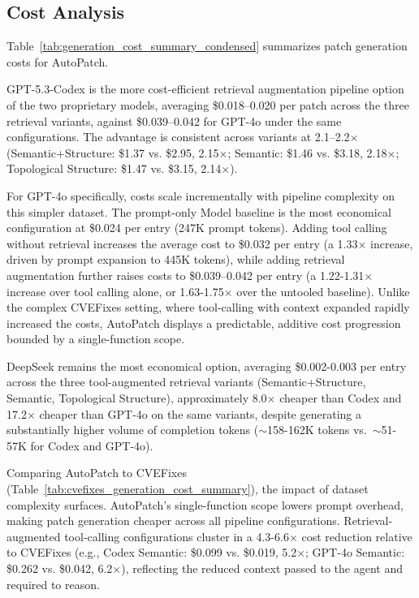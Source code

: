 \subsection{Cost Analysis}\label{sec:autopatch_cost}

Table~\ref{tab:generation_cost_summary_condensed} summarizes patch generation costs for AutoPatch.

GPT-5.3-Codex is the more cost-efficient retrieval augmentation pipeline option of the two proprietary models, averaging \$0.018--0.020 per patch across the three retrieval variants, against \$0.039--0.042 for GPT-4o under the same configurations. The advantage is consistent across variants at 2.1--2.2$\times$ (Semantic+Structure: \$1.37 vs. \$2.95, 2.15$\times$; Semantic: \$1.46 vs. \$3.18, 2.18$\times$; Topological Structure: \$1.47 vs. \$3.15, 2.14$\times$).

For GPT-4o specifically, costs scale incrementally with pipeline complexity on this simpler dataset. The prompt-only Model baseline is the most economical configuration at \$0.024 per entry (247K prompt tokens). Adding tool calling without retrieval increases the average cost to \$0.032 per entry (a 1.33$\times$ increase, driven by prompt expansion to 445K tokens), while adding retrieval augmentation further raises costs to \$0.039--0.042 per entry (a 1.22-1.31$\times$ increase over tool calling alone, or 1.63-1.75$\times$ over the untooled baseline). Unlike the complex CVEFixes setting, where tool-calling with context expanded rapidly increased the costs, AutoPatch displays a predictable, additive cost progression bounded by a single-function scope.

DeepSeek remains the most economical option, averaging \$0.002-0.003 per entry across the three tool-augmented retrieval variants (Semantic+Structure, Semantic, Topological Structure), approximately 8.0$\times$ cheaper than Codex and 17.2$\times$ cheaper than GPT-4o on the same variants, despite generating a substantially higher volume of completion tokens ($\sim$158-162K tokens vs.\ $\sim$51-57K for Codex and GPT-4o).

Comparing AutoPatch to CVEFixes (Table~\ref{tab:cvefixes_generation_cost_summary}), the impact of dataset complexity surfaces. AutoPatch's single-function scope lowers prompt overhead, making patch generation cheaper across all pipeline configurations. Retrieval-augmented tool-calling configurations cluster in a 4.3-6.6$\times$ cost reduction relative to CVEFixes (e.g., Codex Semantic: \$0.099 vs. \$0.019, 5.2$\times$; GPT-4o Semantic:  \$0.262 vs. \$0.042, 6.2$\times$), reflecting the reduced context passed to the agent and required to reason.



